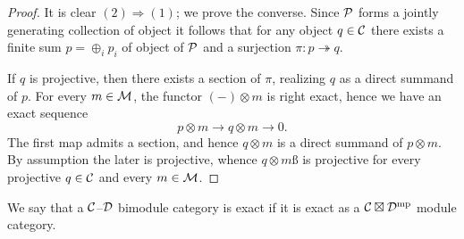 \documentclass{amsart}
\begin{document}
\begin{proof}
	It is clear $(2) \Rightarrow (1)$; we prove the converse. Since $\mathcal P$ forms a jointly generating collection of object it follows that for any object $q \in \mathcal C$ there exists a finite sum $p = \oplus_i p_i$ of object of $\mathcal P$ and a surjection $\pi:p \twoheadrightarrow q$. 
	
		 If $q$ is projective, then there exists a section of $\pi$, realizing $q$ as a direct summand of $p$. For every $m \in \mathcal M$, the functor $(-)\otimes m$ is right exact, hence we have an exact sequence
		\begin{equation*}
			p \otimes m \to q \otimes m \to 0.
		\end{equation*}
		 The first map admits a section, and hence $q \otimes m$ is a direct summand of $p \otimes m$. By assumption the later is projective, whence $q \otimes mß$ is projective for every projective $q \in \mathcal C$ and every $m \in \mathcal M$. 
\end{proof}



\begin{definition}
We say that a $\mathcal C$--$\mathcal D$ bimodule category is exact if it is exact as a $\mathcal C \boxtimes \mathcal D^{\mathrm{mp}}$ module category.
\end{definition}
\end{document}
